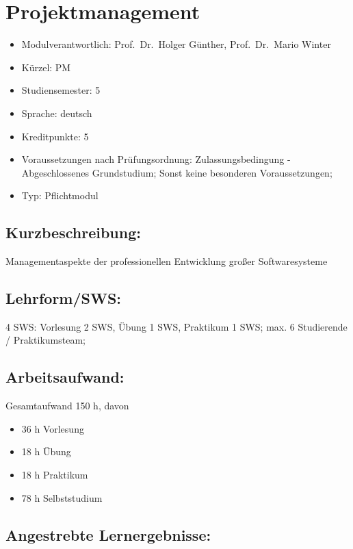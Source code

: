 \chapter{Projektmanagement}\label{projektmanagement}

\begin{itemize}
\tightlist
\item
  Modulverantwortlich: Prof.~Dr.~Holger Günther, Prof.~Dr.~Mario Winter
\item
  Kürzel: PM
\item
  Studiensemester: 5
\item
  Sprache: deutsch
\item
  Kreditpunkte: 5
\item
  Voraussetzungen nach Prüfungsordnung: Zulassungsbedingung -
  Abgeschlossenes Grundstudium; Sonst keine besonderen Voraussetzungen;
\item
  Typ: Pflichtmodul
\end{itemize}

\section*{Kurzbeschreibung:}\label{kurzbeschreibung-2}

Managementaspekte der professionellen Entwicklung großer Softwaresysteme

\section*{Lehrform/SWS:}\label{lehrformsws-20}

4 SWS: Vorlesung 2 SWS, Übung 1 SWS, Praktikum 1 SWS; max. 6 Studierende
/ Praktikumsteam;

\section*{Arbeitsaufwand:}\label{arbeitsaufwand-19}

Gesamtaufwand 150 h, davon

\begin{itemize}
\tightlist
\item
  36 h Vorlesung
\item
  18 h Übung
\item
  18 h Praktikum
\item
  78 h Selbststudium
\end{itemize}

\section*{Angestrebte
Lernergebnisse:}\label{angestrebte-lernergebnisse-20}

